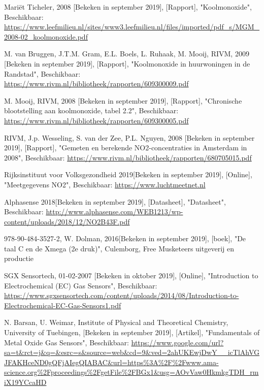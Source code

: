 \documentclass[a4paper, 11pt]{article} %
\begin{document}
	\begin{thebibliography}{9}
		
		Mariët Ticheler, 
		2008 [Bekeken in september 2019],
		[Rapport],
		"Koolmonoxide",
		Beschikbaar: \url{https://www.leefmilieu.nl/sites/www3.leefmilieu.nl/files/imported/pdf_s/MGM_2008-02_koolmonoxide.pdf}
		
		M. van Bruggen, J.T.M. Gram, E.L. Boels, L. Ruhaak, M. Mooij,
		RIVM,
		2009 [Bekeken in september 2019],
		[Rapport],
		"Koolmonoxide in huurwoningen in de Randstad",
		Beschikbaar: \url{https://www.rivm.nl/bibliotheek/rapporten/609300009.pdf}
		
		M. Mooij,
		RIVM,
		2008 [Bekeken in september 2019],
		[Rapport],
		"Chronische blootstelling aan koolmonoxide, tabel 2.2",
		Beschikbaar: \url{https://www.rivm.nl/bibliotheek/rapporten/609300005.pdf}
		
		RIVM, J.p. Wesseling, S. van der Zee, P.L. Nguyen,
		2008 [Bekeken in september 2019],
		[Rapport],
		"Gemeten en berekende NO2-concentraties in Amsterdam in 2008",
		Beschikbaar: \url{https://www.rivm.nl/bibliotheek/rapporten/680705015.pdf}
		
		Rijksinstituut voor Volksgezondheid
		2019[Bekeken in september 2019],
		[Online],
		"Meetgegevens NO2",
		Beschikbaar: \url{https://www.luchtmeetnet.nl}
		
		Alphasense
		2018[Bekeken in september 2019],
		[Datasheet],
		"Datasheet",
		Beschikbaar: \url{http://www.alphasense.com/WEB1213/wp-content/uploads/2018/12/NO2B43F.pdf}
		
		978-90-484-3527-2,
		W. Dolman,
		2016[Bekeken in september 2019],
		[boek],
		"De taal C en de Xmega (2e druk)",
		Culemborg,
		Free Musketeers uitgeverij en productie
		
		SGX Sensortech,
		01-02-2007 [Bekeken in oktober 2019],
		[Online],
		"Introduction to Electrochemical (EC) Gas Sensors",
		Beschikbaar: \url{https://www.sgxsensortech.com/content/uploads/2014/08/Introduction-to-Electrochemical-EC-Gas-Sensors1.pdf}
		
		N. Barsan, U. Weimar,
		Institute of Physical and Theoretical Chemistry, University of Tuebingen,
		[Bekeken in september 2019],
		[Artikel],
		"Fundamentals of Metal Oxide Gas Sensors",
		Beschikbaar: \url{https://www.google.com/url?sa=t\&rct=j\&q=&esrc=s\&source=web\&cd=9\&ved=2ahUKEwjDwY__icTlAhVGJFAKHceND0gQFjAIegQIABAC\&url=https%3A%2F%2Fwww.ama-science.org%2Fproceedings%2FgetFile%2FBGx1&usg=AOvVaw0HkmkgTDH_rmiX19YCcaHD}
		

\end{thebibliography}
\end{document}
